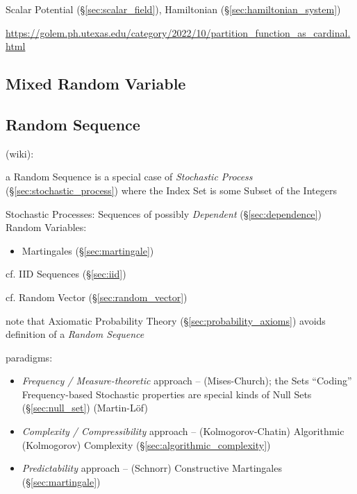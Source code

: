 Scalar Potential (\S\ref{sec:scalar_field}), Hamiltonian
(\S\ref{sec:hamiltonian_system})

\url{https://golem.ph.utexas.edu/category/2022/10/partition_function_as_cardinal.html}



\subsection{Mixed Random Variable}\label{sec:mixed_random_variable}

\subsection{Random Sequence}\label{sec:random_sequence}

(wiki):

a Random Sequence is a special case of \emph{Stochastic Process}
(\S\ref{sec:stochastic_process}) where the Index Set is some Subset of the
Integers

Stochastic Processes: Sequences of possibly \emph{Dependent}
(\S\ref{sec:dependence}) Random Variables:
\begin{itemize}
  \item Martingales (\S\ref{sec:martingale})
\end{itemize}
cf. IID Sequences (\S\ref{sec:iid})

cf. Random Vector (\S\ref{sec:random_vector})

note that Axiomatic Probability Theory (\S\ref{sec:probability_axioms})
avoids definition of a \emph{Random Sequence}

paradigms:
\begin{itemize}
  \item \emph{Frequency / Measure-theoretic} approach -- (Mises-Church); the
    Sets ``Coding'' Frequency-based Stochastic properties are special kinds of
    Null Sets (\S\ref{sec:null_set}) (Martin-L\"of)
  \item \emph{Complexity / Compressibility} approach -- (Kolmogorov-Chatin)
    Algorithmic (Kolmogorov) Complexity (\S\ref{sec:algorithmic_complexity})
  \item \emph{Predictability} approach -- (Schnorr) Constructive Martingales
    (\S\ref{sec:martingale})
\end{itemize}

